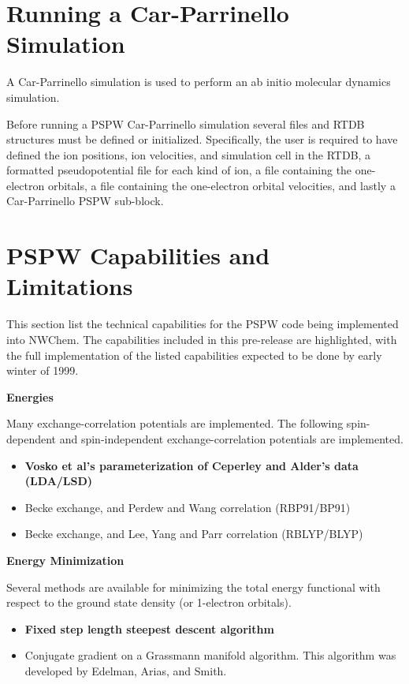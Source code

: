 \begin{verbatim}
\end{verbatim}

\section{Running a Car-Parrinello Simulation}
\label{sec:pspw_cp}

A Car-Parrinello simulation is used to perform an ab initio molecular
dynamics simulation.  

Before running a PSPW Car-Parrinello  simulation several files and
RTDB structures must be defined or initialized.  Specifically, the user 
is required to have defined the ion positions, ion velocities, and 
simulation cell in the RTDB, a formatted pseudopotential file for each 
kind of ion, a file containing the one-electron orbitals, a file containing 
the one-electron orbital velocities, and lastly a Car-Parrinello 
PSPW sub-block. 



\section{PSPW Capabilities and Limitations}
\label{sec:pspw_limits}

This section list the technical capabilities for the PSPW code being 
implemented into NWChem.  The capabilities included in this pre-release
are highlighted, with the full implementation of the listed capabilities 
expected to be done by early winter of 1999.

\large
\textbf{Energies}
\normalsize

Many exchange-correlation potentials are implemented.
The following spin-dependent and spin-independent exchange-correlation
potentials are implemented.
\begin{itemize}
	\item \textbf{Vosko et al's parameterization of Ceperley and 
	       Alder's data (LDA/LSD)}
	\item Becke exchange, and Perdew and Wang correlation (RBP91/BP91)
	\item Becke exchange, and Lee, Yang and Parr correlation (RBLYP/BLYP)
\end{itemize} 

\large
\textbf{Energy Minimization}
\normalsize

Several methods are  available for minimizing the total energy functional
with respect to the ground state density (or 1-electron orbitals).
\begin{itemize}
	\item \textbf{Fixed step length steepest descent algorithm}
	\item Conjugate gradient on a Grassmann manifold algorithm.
	      This algorithm was developed by Edelman, Arias, and Smith.
\end{itemize}

